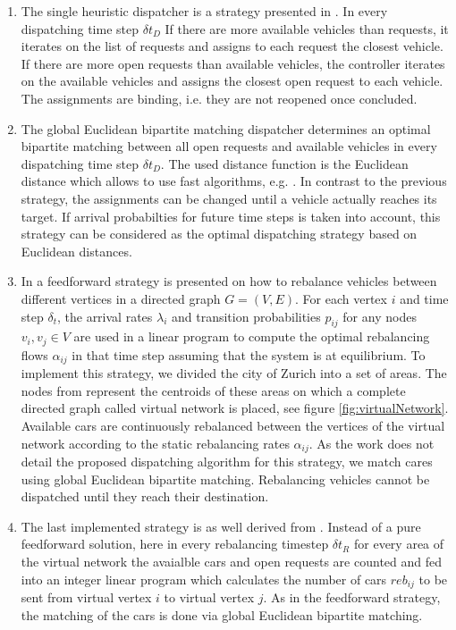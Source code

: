 \begin{enumerate}
\item The single heuristic dispatcher is a strategy presented in \cite{bischoff2016simulation}. In every dispatching time step $\delta t_D$ If there are more available vehicles than requests, it iterates on the list of requests and assigns to each request the closest vehicle. If there are more open requests than available vehicles, the controller iterates on the available vehicles and assigns the closest open request to each vehicle. The assignments are binding, i.e. they are not reopened once concluded.
\item The global Euclidean bipartite matching dispatcher determines an optimal bipartite matching between all open requests and available vehicles in every dispatching time step $\delta t_D$. The used distance function is the Euclidean distance which allows to use fast algorithms, e.g. \cite{agarwal2004near}. In contrast to the previous strategy, the assignments can be changed until a vehicle actually reaches its target. If arrival probabilties for future time steps is taken into account, this strategy can be considered as the optimal dispatching strategy based on Euclidean distances.
\item In \cite{pavone2011load} a feedforward strategy is presented on how to rebalance vehicles between different vertices in a directed graph $G = (V,E)$. For each vertex $i$ and time step $\delta_t$, the arrival rates $\lambda_i$ and transition probabilities $p_{ij}$ for any nodes $v_i, v_j \in V$  are used in a linear program to compute the optimal rebalancing flows $\alpha _{ij}$ in that time step assuming that the system is at equilibrium. To implement this strategy, we divided the city of Zurich into a set of areas. The nodes from \cite{pavone2011load} represent the centroids of these areas on which a complete directed graph called virtual network is placed, see figure \ref{fig:virtualNetwork}. Available cars are continuously rebalanced between the vertices of the virtual network according to the static rebalancing rates $\alpha_{ij}$. As the work does not detail the proposed dispatching algorithm for this strategy, we match cares using global Euclidean bipartite matching. Rebalancing vehicles cannot be dispatched until they reach their destination.
\item The last implemented strategy is as well derived from \cite{pavone2011load}. Instead of a pure feedforward solution, here in every rebalancing timestep $\delta t_R$ for every area of the virtual network the avaialble cars and open requests are counted and fed into an integer linear program which calculates the number of cars $reb _{ij}$ to be sent from virtual vertex $i$ to virtual vertex $j$. As in the feedforward strategy, the matching of the cars is done via global Euclidean bipartite matching.
\end{enumerate}